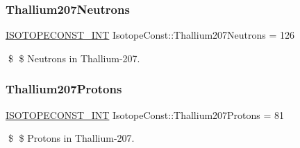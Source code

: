 \subsubsection{\texorpdfstring{Thallium207\+Neutrons}{Thallium207Neutrons}}
{\footnotesize\ttfamily \mbox{\hyperlink{group___isotope_const-_macros_ga5f18360b3e99483a35c32d789e62621c}{I\+S\+O\+T\+O\+P\+E\+C\+O\+N\+S\+T\+\_\+\+I\+NT}} Isotope\+Const\+::\+Thallium207\+Neutrons = 126}

\$ \$ Neutrons in Thallium-\/207. \mbox{\label{group___isotope_const-_thallium-_tl207_ga0cc6d7b197d84008d35ebb313cf8956d}} 
\subsubsection{\texorpdfstring{Thallium207\+Protons}{Thallium207Protons}}
{\footnotesize\ttfamily \mbox{\hyperlink{group___isotope_const-_macros_ga5f18360b3e99483a35c32d789e62621c}{I\+S\+O\+T\+O\+P\+E\+C\+O\+N\+S\+T\+\_\+\+I\+NT}} Isotope\+Const\+::\+Thallium207\+Protons = 81}

\$ \$ Protons in Thallium-\/207. 